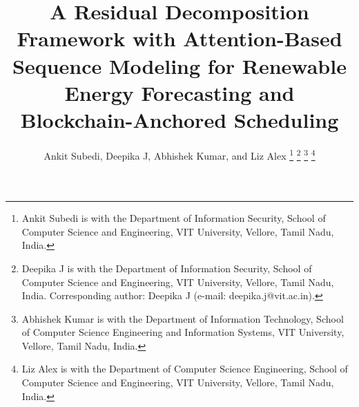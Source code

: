 \documentclass[journal]{IEEEtran}
\begin{document}
\title{A Residual Decomposition Framework with Attention-Based Sequence Modeling for Renewable Energy Forecasting and Blockchain-Anchored Scheduling}

\author{Ankit Subedi, Deepika J, Abhishek Kumar, and Liz Alex%
\thanks{Ankit Subedi is with the Department of Information Security, School of Computer Science and Engineering, VIT University, Vellore, Tamil Nadu, India.}%
\thanks{Deepika J is with the Department of Information Security, School of Computer Science and Engineering, VIT University, Vellore, Tamil Nadu, India. Corresponding author: Deepika J (e-mail: deepika.j@vit.ac.in).}%
\thanks{Abhishek Kumar is with the Department of Information Technology, School of Computer Science Engineering and Information Systems, VIT University, Vellore, Tamil Nadu, India.}%
\thanks{Liz Alex is with the Department of Computer Science Engineering, School of Computer Science and Engineering, VIT University, Vellore, Tamil Nadu, India.}}

\maketitle
\end{document}
